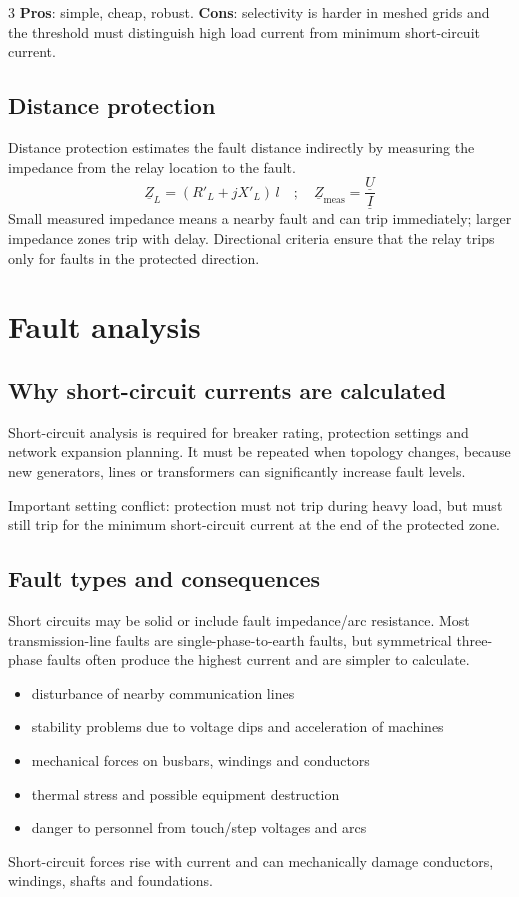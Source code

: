 \documentclass[9pt, landscape, a4paper]{article}
\begin{document}
\begin{multicols*}{3}
\textbf{Pros}: simple, cheap, robust. \textbf{Cons}: selectivity is harder in
meshed grids and the threshold must distinguish high load current from minimum
short-circuit current.

\subsection{Distance protection}
Distance protection estimates the fault distance indirectly by measuring the
impedance from the relay location to the fault.
\[
  \underline Z_L=(R'_L+jX'_L)\,l
  \quad ; \quad
  \underline Z_{\mathrm{meas}}=\frac{\underline U}{\underline I}
\]
Small measured impedance means a nearby fault and can trip immediately; larger
impedance zones trip with delay. Directional criteria ensure that the relay
trips only for faults in the protected direction.

\section{Fault analysis}
\subsection{Why short-circuit currents are calculated}
Short-circuit analysis is required for breaker rating, protection settings and
network expansion planning. It must be repeated when topology changes, because
new generators, lines or transformers can significantly increase fault levels.

Important setting conflict: protection must not trip during heavy load, but
must still trip for the minimum short-circuit current at the end of the
protected zone.

\subsection{Fault types and consequences}
Short circuits may be solid or include fault impedance/arc resistance. Most
transmission-line faults are single-phase-to-earth faults, but symmetrical
three-phase faults often produce the highest current and are simpler to
calculate.

\begin{itemize}
  \item disturbance of nearby communication lines
  \item stability problems due to voltage dips and acceleration of machines
  \item mechanical forces on busbars, windings and conductors
  \item thermal stress and possible equipment destruction
  \item danger to personnel from touch/step voltages and arcs
\end{itemize}
Short-circuit forces rise with current and can mechanically damage conductors,
windings, shafts and foundations.


\end{multicols*}
\end{document}
